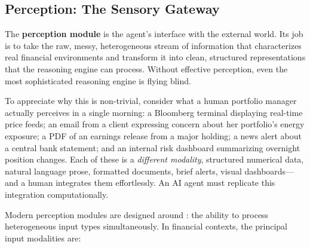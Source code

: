 \documentclass{article}
\begin{document}


\subsection{Perception: The Sensory Gateway}
\label{subsec:perception}

The \textbf{perception module} is the agent's interface with the external world. Its job is to take the raw, messy, heterogeneous stream of information that characterizes real financial environments and transform it into clean, structured representations that the reasoning engine can process. Without effective perception, even the most sophisticated reasoning engine is flying blind.

To appreciate why this is non-trivial, consider what a human portfolio manager actually perceives in a single morning: a Bloomberg terminal displaying real-time price feeds; an email from a client expressing concern about her portfolio's energy exposure; a PDF of an earnings release from a major holding; a news alert about a central bank statement; and an internal risk dashboard summarizing overnight position changes. Each of these is a \textit{different modality}, structured numerical data, natural language prose, formatted documents, brief alerts, visual dashboards—and a human integrates them effortlessly. An AI agent must replicate this integration computationally.

Modern perception modules are designed around : the ability to process heterogeneous input types simultaneously. In financial contexts, the principal input modalities are:
\end{document}
